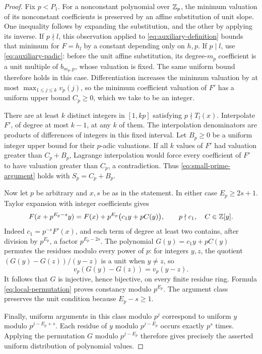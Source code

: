 \begin{proof}
Fix $p<P_1$.  For a nonconstant polynomial over $\mathbb Z_p$, the
minimum valuation of its nonconstant coefficients is preserved by an
affine substitution of unit slope.  One inequality follows by expanding
the substitution, and the other by applying its inverse.  If $p\nmid l$,
this observation applied to \eqref{eq:auxiliary-definition} bounds that
minimum for $F=h_l$ by a constant depending only on $h,p$.  If $p\mid l$,
use \eqref{eq:auxiliary-padic}: before the unit affine substitution, its
degree-$m_p$ coefficient is a unit multiple of $b_{m_p,p}$, whose
valuation is fixed.  The same uniform bound therefore holds in this
case.  Differentiation increases the minimum valuation by at most
$\max_{1\le j\le k}v_p(j)$, so the minimum coefficient valuation of
$F'$ has a uniform upper bound $C_p\ge0$, which we take to be an integer.

There are at least $k$ distinct integers in $[1,kp]$ satisfying
$p\nmid T_l(x)$.  Interpolate $F'$, of degree at most $k-1$, at any
$k$ of them.  The interpolation denominators are products of differences
of integers in this fixed interval.  Let $B_p\ge0$ be a uniform integer
upper bound for their $p$-adic valuations.  If all $k$ values of $F'$ had
valuation greater than $C_p+B_p$, Lagrange interpolation would force
every coefficient of $F'$ to have valuation greater than $C_p$, a
contradiction.  Thus \eqref{eq:small-prime-argument} holds with
$S_p=C_p+B_p$.

Now let $p$ be arbitrary and $x,s$ be as in the statement.  In either
case $E_p\ge2s+1$.  Taylor expansion with integer coefficients gives
\begin{equation}\label{eq:local-permutation}
 F(x+p^{E_p-s}y)=F(x)+p^{E_p}\big(c_1y+pC(y)\big),
 \qquad p\nmid c_1,\quad C\in\mathbb Z[y].
\end{equation}
Indeed $c_1=p^{-s}F'(x)$, and each term of degree at least two contains,
after division by $p^{E_p}$, a factor $p^{E_p-2s}$.
The polynomial $G(y)=c_1y+pC(y)$ permutes the residues modulo every
power of $p$: for integers $y,z$, the quotient
$(G(y)-G(z))/(y-z)$ is a unit when $y\ne z$, so
\[
 v_p(G(y)-G(z))=v_p(y-z).
\]
It follows that $G$ is injective, hence bijective, on every finite
residue ring.  Formula \eqref{eq:local-permutation} proves constancy
modulo $p^{E_p}$.  The argument class preserves the unit condition
because $E_p-s\ge1$.

Finally, uniform arguments in this class modulo $p^j$ correspond to
uniform $y$ modulo $p^{j-E_p+s}$.  Each residue of $y$ modulo
$p^{j-E_p}$ occurs exactly $p^s$ times.  Applying the permutation $G$
modulo $p^{j-E_p}$ therefore gives precisely the asserted uniform
distribution of polynomial values.
\end{proof}

